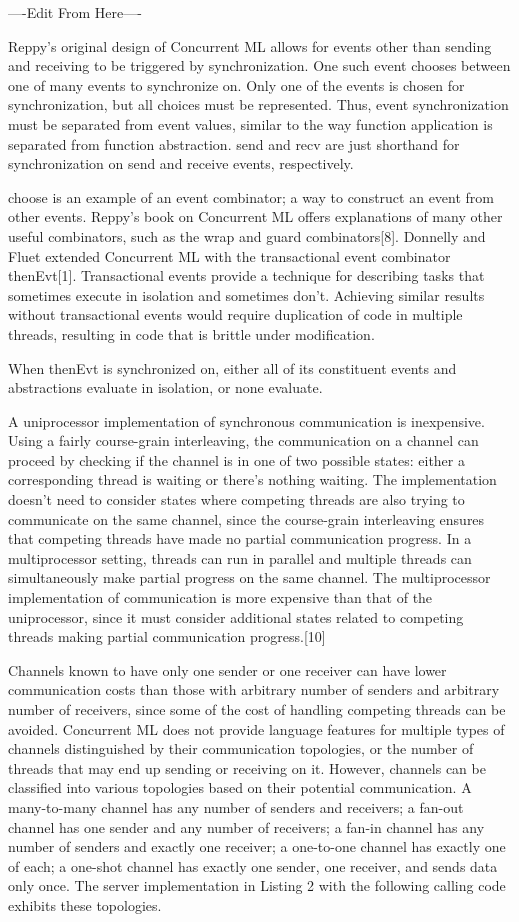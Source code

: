 \documentclass{article}
\begin{document}
----Edit From Here----

Reppy's original design of Concurrent ML allows for events other than sending and receiving to
be triggered by synchronization.  One such event chooses between one of many events to
synchronize on.  Only one of the events is chosen for synchronization, but all choices must be
represented.  Thus, event synchronization must be separated from event values, similar to the
way function application is separated from function abstraction.  send and recv are just
shorthand for synchronization on send and receive events, respectively.


choose is an example of an event combinator; a way to construct an event from other events.
Reppy's book on Concurrent ML offers explanations of many other useful combinators, such as the
wrap and guard combinators[8].  Donnelly and Fluet extended Concurrent ML with the
transactional event combinator thenEvt[1].  Transactional events provide a technique for
describing tasks that sometimes execute in isolation and sometimes don't.  Achieving similar
results without transactional events would require duplication of code in multiple threads,
resulting in code that is brittle under modification.

When  thenEvt is synchronized on, either all of its constituent events and abstractions
evaluate in isolation, or none evaluate.


A uniprocessor implementation of synchronous communication is inexpensive.  Using a fairly
course-grain interleaving, the communication on a channel can proceed by checking if the
channel is in one of two possible states: either a corresponding thread is waiting or there's
nothing waiting.  The implementation doesn't need to consider states where competing threads
are also trying to communicate on the same channel, since the course-grain interleaving ensures
that competing threads have made no partial communication progress.  In a multiprocessor
setting, threads can run in parallel and multiple threads can simultaneously make partial
progress on the same channel.  The multiprocessor implementation of communication is more
expensive than that of the uniprocessor, since it must consider additional states related to
competing threads making partial communication progress.[10]

Channels known to have only one sender or one receiver can have lower communication costs than
those with arbitrary number of senders and arbitrary number of receivers, since some of the
cost of handling competing threads can be avoided.  Concurrent ML does not provide language
features for multiple types of channels distinguished by their communication topologies, or the
number of threads that may end up sending or receiving on it.  However, channels can be
classified into various topologies based on their potential communication.  A many-to-many
channel has any number of senders and receivers; a fan-out channel has one sender and any
number of receivers; a fan-in channel has any number of senders and exactly one receiver; a
one-to-one channel has exactly one of each; a one-shot channel has exactly one sender, one
receiver, and sends data only once.  The server implementation in Listing 2  with the following
calling code exhibits these topologies.
\end{document}
